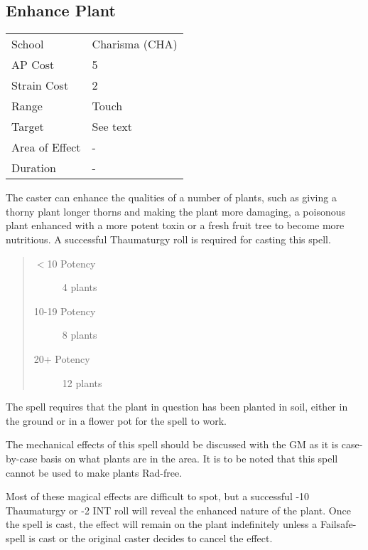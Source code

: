 \documentclass[11pt,a4paper,twocolumn]{book}
\begin{document}
\subsection*{Enhance Plant}
{
	\begin{tabu} to 75mm{| X[l,4] | X[l,7] |}
		\hline
		School 			& Charisma (CHA) 	\\
		AP Cost	      	& 5 				\\
		Strain Cost     & 2 				\\
		Range     		& Touch 				\\
		Target      	& See text 				\\
		Area of Effect  & - 	 			\\
		Duration     	& - 	\\ \hline
	\end{tabu}
	
}

\medskip

The caster can enhance the qualities of a number of plants, such as giving a thorny plant longer thorns and making the plant more damaging, a poisonous plant enhanced with a more potent toxin or a fresh fruit tree to become more nutritious.
A successful Thaumaturgy roll is required for casting this spell.

\begin{quote}
	\begin{description}
		\item[$<$10 Potency] 	4 plants
		\item[10-19 Potency] 	8 plants
		\item[20+ Potency] 	    12 plants
	\end{description}
\end{quote}

The spell requires that the plant in question has been planted in soil, either in the ground or in a flower pot for the spell to work.

The mechanical effects of this spell should be discussed with the GM as it is case-by-case basis on what plants are in the area. It is to be noted that this spell cannot be used to make plants Rad-free.

Most of these magical effects are difficult to spot, but a successful -10 Thaumaturgy or -2 INT roll will reveal the enhanced nature of the plant.
Once the spell is cast, the effect will remain on the plant indefinitely unless a Failsafe-spell is cast or the original caster decides to cancel the effect.
\end{document}
